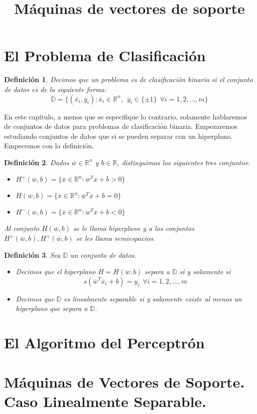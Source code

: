 \documentclass[11pt]{article}
\newtheorem{definition}{Definición}[section]
\newcommand{\Rn}{\mathbb{R}^{n}}
\newcommand{\R}{\mathbb{R}}
\newcommand{\wv}{\overline{w}}
\newcommand{\x}{\overline{x}}
\newcommand{\y}{\overline{y}}
\newcommand{\Sm}{1,2,\ldots, m}
\newcommand{\Dat}{\mathbb{D}}
\begin{document}
\title{Máquinas de vectores de soporte}
\section{El Problema de Clasificación}


\begin{definition}
Decimos que un problema es de clasificación binaria si el conjunto de datos es de la siguiente forma:
$$\Dat=\{(\x_{i}, y_i): \x_{i}\in\Rn,\ \ \y_{i}\in\{\pm1\}\ \ \forall i = \Sm\}$$
\end{definition}

En este capítulo, a menos que se especifique lo contrario, solamente hablaremos de conjuntos de datos para problemas de clasificación binaria.
Empezaremos estudiando conjuntos de datos que si se pueden separar con un hiperplano. Empecemos con la definición.

\begin{definition}
Dados $\wv\in\Rn$ y $b\in\R$, distinguimos los siguientes tres conjuntos:
\begin{itemize}
\item[(i)] $H^{+}(\wv, b)=\{\x\in\Rn:\wv^{T}\x+b>0\}$
\item[(ii)] $H(\wv, b)=\{\x\in\Rn:\wv^{T}\x+b=0\}$
\item[(iii)] $H^{-}(\wv, b)=\{\x\in\Rn:\wv^{T}\x+b<0\}$
\end{itemize}
Al conjunto $H(\wv, b)$ se le llama \emph{hiperplano} y a los conjuntos $H^{+}(\wv, b), H^{+}(\wv, b)$ se les llama \emph{semiespacios}.
\end{definition}

\begin{definition}
Sea $\Dat$ un conjunto de datos.
\begin{itemize}
\item[(i)] Decimos que el hiperplano $H=H(\wv, b)$ separa a $\Dat$ si y solamente si
$$s(\wv^{T}\x_{i}+b)=y_{i}\ \ \forall i=\Sm$$
\item[(ii)] Decimos que $\Dat$ es linealmente separable si y solamente existe al menos un hiperplano que separa a $\Dat$.
\end{itemize}
\end{definition}
\section{El Algoritmo del Perceptrón}
\section{Máquinas de Vectores de Soporte. Caso Linealmente Separable.}
\end{document}
